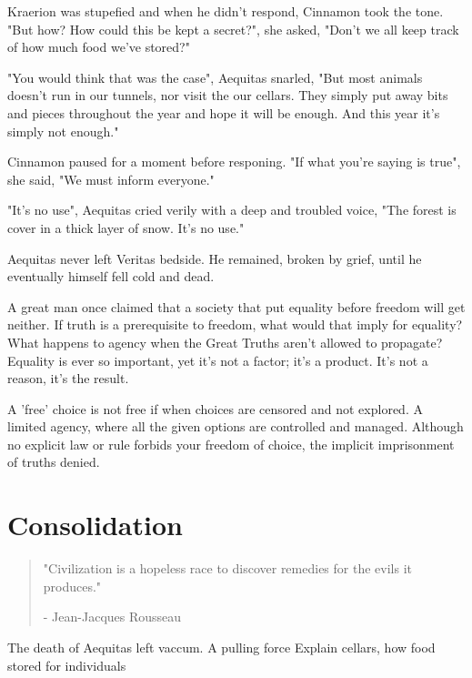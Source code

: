 \documentclass[smalldemyvopaper,11pt,twoside,onecolumn,openright,extrafontsizes]{memoir}
\begin{document}
Kraerion was stupefied and when he didn't respond, Cinnamon took the tone. "But how? How could this be kept a secret?", she asked, "Don't we all keep track of how much food we've stored?"

"You would think that was the case", Aequitas snarled, "But most animals doesn't run in our tunnels, nor visit the our cellars. They simply put away bits and pieces throughout the year and hope it will be enough. And this year it's simply not enough."

Cinnamon paused for a moment before responing. "If what you're saying is true", she said, "We must inform everyone."

"It's no use", Aequitas cried verily with a deep and troubled voice, "The forest is cover in a thick layer of snow. It's no use."


Aequitas never left Veritas bedside. He remained, broken by grief, until he eventually himself fell cold and dead. 

A great man once claimed that a society that put equality before freedom will get neither. If truth is a prerequisite to freedom, what would that imply for equality? What happens to agency when the Great Truths aren't allowed to propagate? Equality is ever so important, yet it's not a factor; it's a product. It's not a reason, it's the result.

A 'free' choice is not free if when choices are censored and not explored. A limited agency, where all the given options are controlled and managed. Although no explicit law or rule forbids your freedom of choice, the implicit imprisonment of truths denied. 
\chapter{Consolidation}

\vspace{-1.3cm}
\begin{localsize}{10}
	\begin{quote}
		"Civilization is a hopeless race to discover remedies for the evils it produces."
		\begin{flushright}- Jean-Jacques Rousseau\end{flushright}
	\end{quote} 
\end{localsize}
\vspace{1cm}

The death of Aequitas left vaccum. A pulling force Explain cellars, how food stored for individuals 
\end{document}
